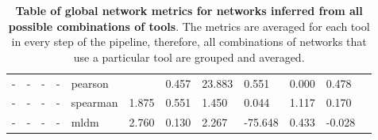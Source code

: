 \begin{landscape}
\begin{table}[H]
\begin{tabular}{|l|p{1cm}|p{1cm}|p{1cm}|p{2cm}|p{1.5cm}|p{1.5cm}|p{1.5cm}|p{1.5cm}|p{1.5cm}|p{1.5cm}|p{1.5cm}|}
-  & -             & -                 & -           & pearson    &                              & 0.457              & 23.883                      & 0.551      & 0.000             & 0.478                            \\
-  & -             & -                 & -           & spearman   & 1.875                        & 0.551              & 1.450                       & 0.044      & 1.117             & 0.170                            \\
-  & -             & -                 & -           & mldm       & 2.760                        & 0.130              & 2.267                       & -75.648    & 0.433             & -0.028                           \\ \hline
\end{tabular}
\caption{
  \textbf{Table of global network metrics for networks inferred from all possible combinations of tools}.
  The metrics are averaged for each tool in every step of the pipeline, therefore, all combinations of networks that use a particular tool are grouped and averaged.
}
\label{tab:network_metrics}
\end{table}
\end{landscape}


